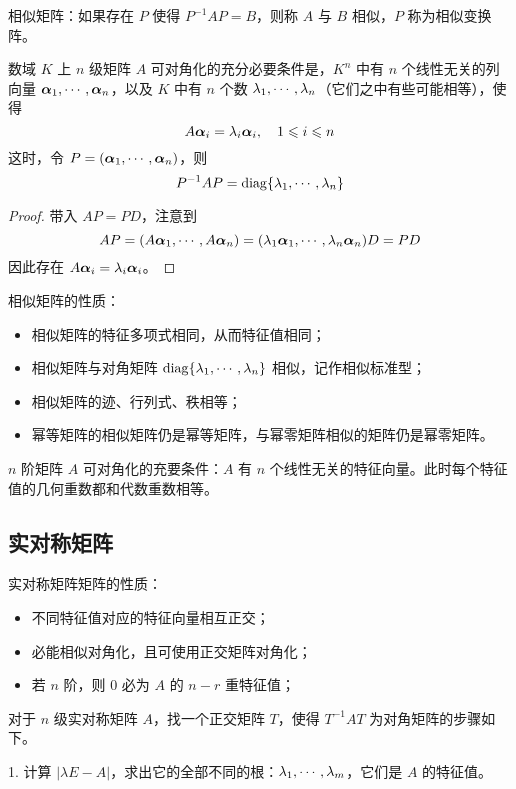 相似矩阵：如果存在 $P$ 使得 $P^{-1} A P = B$，则称 $A$ 与 $B$ 相似，$P$ 称为相似变换阵。

\begin{theorem}
	数域 $K$ 上 $n$ 级矩阵 $A$ 可对角化的充分必要条件是，$K^n$ 中有 $n$ 个线性无关的列向量 $\boldsymbol{\alpha}_1,\cdots,\boldsymbol{\alpha}_n$，以及 $K$ 中有 $n$ 个数 $\lambda_1,\cdots,\lambda_n$（它们之中有些可能相等），使得
	\[ A\boldsymbol{\alpha}_i = \lambda_i \boldsymbol{\alpha}_i, \quad  1 \leqslant i \leqslant n \]
	这时，令 $P = (\boldsymbol{\alpha}_1,\cdots,\boldsymbol{\alpha}_n)$，则
	\[ P^{-1}AP = \operatorname{diag} \{\lambda_1,\cdots,\lambda_n\} \]
\end{theorem}

\begin{proof}
	带入 $AP = PD$，注意到
	\[ AP = (A\boldsymbol{\alpha}_1,\cdots,A\boldsymbol{\alpha}_n) = (\lambda_1 \boldsymbol{\alpha}_1, \cdots, \lambda_n \boldsymbol{\alpha}_n)D = PD \]
	因此存在 $A \boldsymbol{\alpha}_i = \lambda_i \boldsymbol{\alpha}_i$。
\end{proof}

相似矩阵的性质：
\begin{itemize}
	\item 相似矩阵的特征多项式相同，从而特征值相同；
	\item 相似矩阵与对角矩阵 $\operatorname{diag}\{\lambda_1,\cdots,\lambda_n\}$ 相似，记作相似标准型；
	\item 相似矩阵的迹、行列式、秩相等；
	\item 幂等矩阵的相似矩阵仍是幂等矩阵，与幂零矩阵相似的矩阵仍是幂零矩阵。
\end{itemize}

$n$ 阶矩阵 $A$ 可对角化的充要条件：$A$ 有 $n$ 个线性无关的特征向量。此时每个特征值的几何重数都和代数重数相等。

\subsection{实对称矩阵}

实对称矩阵矩阵的性质：
\begin{itemize}
	\item 不同特征值对应的特征向量相互正交；
	\item 必能相似对角化，且可使用正交矩阵对角化；
	\item 若 $n$ 阶，则 $0$ 必为 $A$ 的 $n-r$ 重特征值；
\end{itemize}

对于 $n$ 级实对称矩阵 $A$，找一个正交矩阵 $T$，使得 $T^{-1}AT$ 为对角矩阵的步骤如下。

1. 计算 $|\lambda E- A|$，求出它的全部不同的根：$\lambda_1,\cdots,\lambda_m$，它们是 $A$ 的特征值。

